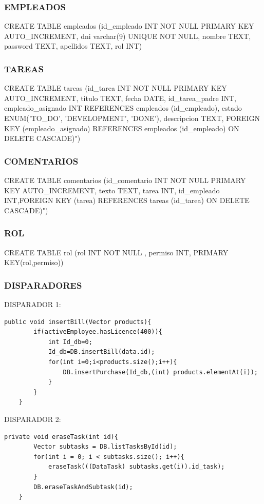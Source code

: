 \documentclass[paper=a4, fontsize=11pt, spanish]{scrartcl}
\begin{document}
\subsubsection *{EMPLEADOS}
CREATE TABLE empleados (id\_empleado INT NOT NULL PRIMARY KEY AUTO\_INCREMENT, dni varchar(9) UNIQUE NOT NULL,  nombre TEXT, password TEXT, apellidos TEXT, rol INT)

\subsubsection *{TAREAS}
CREATE TABLE tareas (id\_tarea INT NOT NULL PRIMARY KEY AUTO\_INCREMENT, titulo TEXT, fecha DATE, id\_tarea\_padre INT, empleado\_asignado INT REFERENCES empleados (id\_empleado), estado ENUM('TO\_DO', 'DEVELOPMENT', 'DONE'), descripcion TEXT, FOREIGN KEY (empleado\_asignado) REFERENCES empleados (id\_empleado) ON DELETE CASCADE)")

\subsubsection *{COMENTARIOS}
CREATE TABLE comentarios (id\_comentario INT NOT NULL PRIMARY KEY AUTO\_INCREMENT, texto TEXT, tarea INT, id\_empleado INT,FOREIGN KEY (tarea) REFERENCES tareas (id\_tarea) ON DELETE CASCADE)")

\subsubsection *{ROL}
CREATE TABLE rol (rol INT NOT NULL , permiso INT, PRIMARY KEY(rol,permiso))

\subsubsection{DISPARADORES}
DISPARADOR 1:
\lstset{language=C, breaklines=true, basicstyle=\footnotesize}
\begin{lstlisting}[frame=single]
    public void insertBill(Vector products){
        if(activeEmployee.hasLicence(400)){
            int Id_db=0;
            Id_db=DB.insertBill(data.id);
            for(int i=0;i<products.size();i++){
                DB.insertPurchase(Id_db,(int) products.elementAt(i));
            }
        }
    }
\end{lstlisting}
\newpage
DISPARADOR 2:
\lstset{language=C, breaklines=true, basicstyle=\footnotesize}
\begin{lstlisting}[frame=single]
    private void eraseTask(int id){
        Vector subtasks = DB.listTasksById(id);
        for(int i = 0; i < subtasks.size(); i++){
            eraseTask(((DataTask) subtasks.get(i)).id_task);
        }
        DB.eraseTaskAndSubtask(id);
    }
\end{lstlisting}
\end{document}
